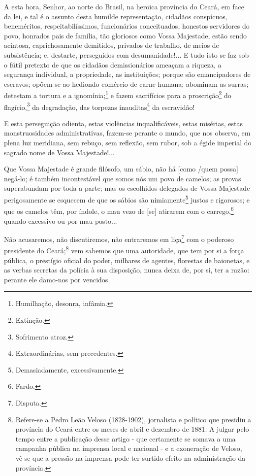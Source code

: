 {A esta hora, Senhor, ao norte do Brasil, na heroica província do Ceará,
em face da lei, e tal é o assunto desta humilde representação, cidadãos
conspícuos, beneméritos, respeitabilíssimos, funcionários conceituados,
honestos servidores do povo, honrados pais de família, tão gloriosos
como Vossa Majestade, estão sendo acintosa, caprichosamente demitidos,
privados de trabalho, de meios de subsistência; e, destarte, perseguidos
com desumanidade!... E tudo isto se faz sob o fútil pretexto de que os
cidadãos demissionários ameaçam a riqueza, a segurança individual, a
propriedade, as instituições; porque são emancipadores de escravos;
opõem-se ao hediondo comércio de carne humana; abominam as surras;
detestam a tortura e a ignomínia;\footnote{Humilhação, desonra,
  infâmia.} e fazem sacrifícios para a proscrição\footnote{Extinção.}
do flagício,\footnote{Sofrimento atroz.} da degradação, das torpezas
inauditas\footnote{Extraordinárias, sem precedentes.} da escravidão!

E esta perseguição odienta, estas violências inqualificáveis, estas
misérias, estas monstruosidades administrativas, fazem-se perante o
mundo, que nos observa, em plena luz meridiana, sem rebuço, sem
reflexão, sem rubor, sob a égide imperial do sagrado nome de Vossa
Majestade!...

Que Vossa Majestade é grande filósofo, um sábio, não há {[}como /quem
possa{]} negá-lo; é também incontestável que somos nós um povo de
camelos; as provas superabundam por toda a parte; mas os escolhidos
delegados de Vossa Majestade perigosamente se esquecem de que os sábios
são nimiamente\footnote{Demasiadamente, excessivamente.} justos e
rigorosos; e que os camelos têm, por índole, o mau vezo de {[}se{]}
atirarem com o carrego,\footnote{Fardo.} quando excessivo ou por mau
posto...

Não acusaremos, não discutiremos, não entraremos em liça\footnote{
  Disputa.} com o poderoso presidente do Ceará;\footnote{Refere-se a
  Pedro Leão Veloso (1828-1902), jornalista e político que presidiu a
  província do Ceará entre os meses de abril e dezembro de 1881. A
  julgar pelo tempo entre a publicação desse artigo - que certamente se
  somava a uma campanha pública na imprensa local e nacional - e a
  exoneração de Veloso, vê-se que a pressão na imprensa pode ter surtido
  efeito na administração da província.} vem sabemos que uma autoridade,
que tem por si a força pública, o prestígio oficial do poder, milhares
de agentes, florestas de baionetas, e as verbas secretas da polícia à
sua disposição, nunca deixa de, por si, ter a razão: perante ele
damo-nos por vencidos.

}
